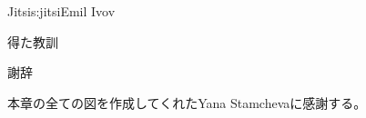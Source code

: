 \begin{aosachapter}{Jitsi}{s:jitsi}{Emil Ivov}
\begin{aosasect1}{得た教訓}
\end{aosasect1}

\begin{aosasect1}{謝辞}

本章の全ての図を作成してくれたYana Stamchevaに感謝する。

\end{aosasect1}

\end{aosachapter}
